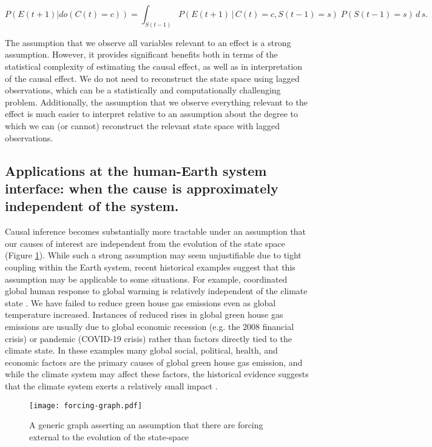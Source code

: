 \documentclass[12pt]{article}
\begin{document}
\begin{equation}
  P(E(t+1)| do(C(t)=c)) = \int_{S(t-1)} P(E(t+1) \, | \, C(t)=c,
  S(t-1) = s
  )\; P(S(t-1)=s) \, d \, s.
\end{equation}

The assumption that we observe all variables relevant to an effect is
a strong assumption. However, it provides significant benefits both in
terms of the statistical complexity of estimating the causal effect,
as well as in interpretation of the causal effect. We do not need to
reconstruct the state space  using lagged observations, which can be a
statistically and computationally challenging problem. Additionally,
the assumption that we observe everything relevant to the effect is
much easier to interpret relative to an assumption about the degree to
which we can (or cannot) reconstruct the relevant state space with
lagged observations.

\subsection{Applications at the human-Earth system interface: when the
  cause is approximately independent of the system.}
\label{human}

Causal inference becomes substantially more tractable under an
assumption that our causes of interest are independent from the
evolution of the state space (Figure \ref{fig:forcing}). While such a
strong assumption may seem unjustifiable due to tight coupling within
the Earth system, recent historical examples suggest that this
assumption may be applicable to some situations. For example,
coordinated global human response to global warming is relatively
independent of the climate state \citep{arto2014drivers}. We have
failed to reduce green house gas emissions even as global temperature
increased. Instances of reduced rises in global green house gas
emissions are usually due to global economic recession (e.g. the 2008
financial crisis) or pandemic (COVID-19 crisis) rather than factors
directly tied to the climate state. In these examples many global
social, political, health, and economic factors are the primary causes
of global green house gas emission, and while the climate system may
affect these factors, the historical evidence suggests that the
climate system exerts a relatively small impact
\citep{arto2014drivers}.

\begin{figure}
  \texttt{[image: forcing-graph.pdf]}
  \caption{A generic graph asserting an assumption that there are
    forcing external to the evolution of the state-space}
  \label{fig:forcing}
\end{figure}
\end{document}
